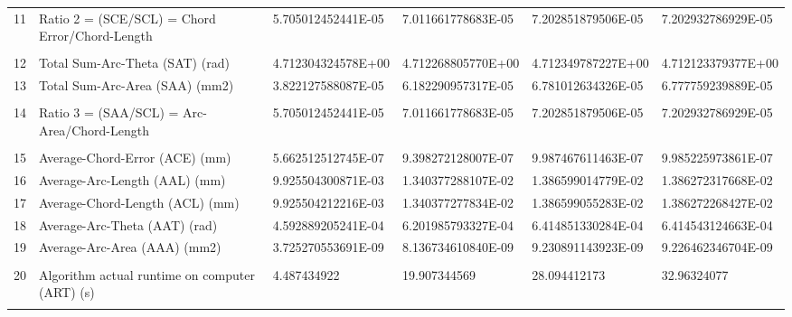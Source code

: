 \begin{landscape}
\begin{table}[ht]
{\begin{tabular}{ p{0.2cm} p{8.80cm} p{4.00cm} p{4.0cm} p{4.00cm} p{4.0cm}}
	11	&	Ratio 2 = (SCE/SCL) = Chord Error/Chord-Length	&	5.705012452441E-05	&	7.011661778683E-05	&	7.202851879506E-05	&	7.202932786929E-05	\\
	&		&		&		&		&		\\
	12	&	Total Sum-Arc-Theta (SAT) (rad)	&	4.712304324578E+00	&	4.712268805770E+00	&	4.712349787227E+00	&	4.712123379377E+00	\\
	13	&	Total Sum-Arc-Area (SAA) (mm2)	&	3.822127588087E-05	&	6.182290957317E-05	&	6.781012634326E-05	&	6.777759239889E-05	\\
	&		&		&		&		&		\\
	14	&	Ratio 3 = (SAA/SCL) = Arc-Area/Chord-Length	&	5.705012452441E-05	&	7.011661778683E-05	&	7.202851879506E-05	&	7.202932786929E-05	\\
	&		&		&		&		&		\\
	15	&	Average-Chord-Error (ACE) (mm)	&	5.662512512745E-07	&	9.398272128007E-07	&	9.987467611463E-07	&	9.985225973861E-07	\\
	16	&	Average-Arc-Length (AAL) (mm)	&	9.925504300871E-03	&	1.340377288107E-02	&	1.386599014779E-02	&	1.386272317668E-02	\\
	17	&	Average-Chord-Length (ACL) (mm)	&	9.925504212216E-03	&	1.340377277834E-02	&	1.386599055283E-02	&	1.386272268427E-02	\\
	18	&	Average-Arc-Theta (AAT) (rad)	&	4.592889205241E-04	&	6.201985793327E-04	&	6.414851330284E-04	&	6.414543124663E-04	\\
	19	&	Average-Arc-Area (AAA) (mm2)	&	3.725270553691E-09	&	8.136734610840E-09	&	9.230891143923E-09	&	9.226462346704E-09	\\
	&		&		&		&		&		\\
	20	&	Algorithm actual runtime on computer (ART) (s) 	&	4.487434922	&	19.907344569	&	28.094412173	&	32.96324077	\\
	&		&		&		&		&		\\
\hline	
\end{tabular}			

}   %
		
\end{table}
\end{landscape}

\clearpage
\pagebreak
